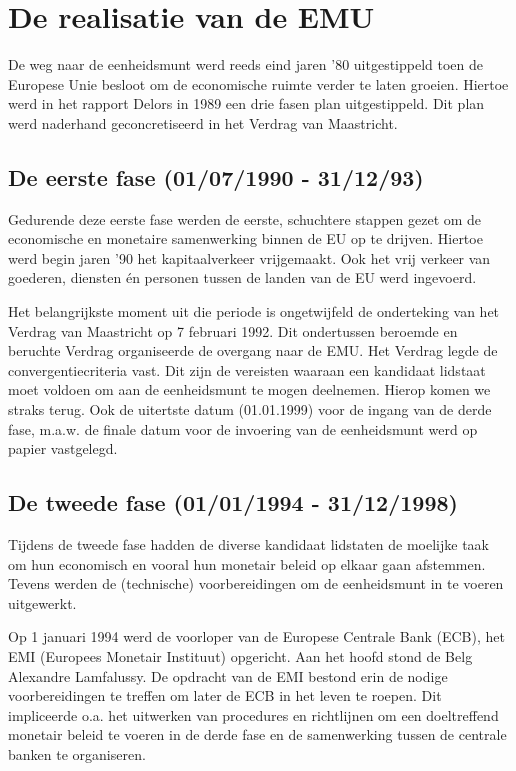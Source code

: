 \chapter{De realisatie van de EMU}

De weg naar de eenheidsmunt werd reeds eind jaren '80 uitgestippeld
toen de Europese Unie besloot om de economische ruimte verder te
laten groeien. Hiertoe werd in het rapport Delors in 1989 een drie
fasen plan uitgestippeld. Dit plan werd naderhand geconcretiseerd in
het Verdrag van Maastricht.

\section{De eerste fase (01/07/1990 - 31/12/93)}

Gedurende deze eerste fase werden de eerste, schuchtere stappen
gezet om de economische en monetaire samenwerking binnen de EU op te
drijven. Hiertoe werd begin jaren '90 het kapitaalverkeer
vrijgemaakt. Ook het vrij verkeer van goederen, diensten \'en personen
tussen de landen van de EU werd ingevoerd.

Het belangrijkste moment uit die periode is ongetwijfeld de
onderteking van het Verdrag van Maastricht op 7 februari 1992. Dit
ondertussen beroemde en beruchte Verdrag organiseerde de overgang
naar de EMU. Het Verdrag legde de convergentiecriteria vast. Dit
zijn de vereisten waaraan een kandidaat lidstaat moet voldoen om aan
de eenheidsmunt te mogen deelnemen. Hierop komen we straks terug.
Ook de uitertste datum (01.01.1999) voor de ingang van de derde
fase, m.a.w. de finale datum voor de invoering van de eenheidsmunt
werd op papier vastgelegd.

\section{De tweede fase (01/01/1994 - 31/12/1998)}

Tijdens de tweede fase hadden de diverse kandidaat lidstaten de
moelijke taak om hun economisch en vooral hun monetair beleid op
elkaar gaan afstemmen. Tevens werden de (technische) voorbereidingen
om de eenheidsmunt in te voeren uitgewerkt.

Op 1 januari 1994 werd de voorloper van de Europese Centrale Bank
(ECB), het EMI (Europees Monetair Instituut) opgericht. Aan het
hoofd stond de Belg Alexandre Lamfalussy. De opdracht van de EMI
bestond erin de nodige voorbereidingen te treffen om later de ECB in
het leven te roepen. Dit impliceerde o.a. het uitwerken van
procedures en richtlijnen om een doeltreffend monetair beleid te
voeren in de derde fase en de samenwerking tussen de centrale banken
te organiseren.

